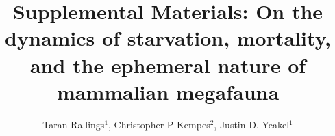 \documentclass[]{rsos}%
\begin{document}
\title{Supplemental Materials: On the dynamics of starvation, mortality, and the ephemeral nature of mammalian megafauna}

\author{%
Taran Rallings$^{1}$, Christopher P Kempes$^{2}$, Justin D. Yeakel$^{1}$} 

\address{
$^{1}$School of Natural Sciences, University of California Merced\\
$^{2}$Santa Fe Institute}

\subject{foodwebs, paleontology, ecology}










\maketitle
\end{document}
